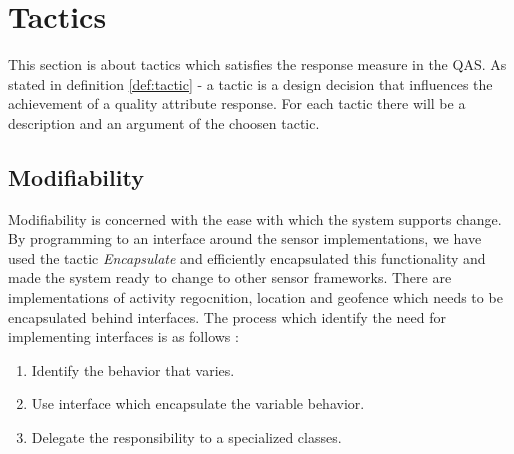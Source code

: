 \section{Tactics}
This section is about tactics which satisfies the response measure in the QAS. As stated in definition \ref{def:tactic} - a tactic is a design decision that influences the achievement of a quality attribute response. For each tactic there will be a description and an argument of the choosen tactic. 

\subsection{Modifiability}
\label{subsec:modifiability}
 Modifiability is concerned with the ease with which the system supports change. By programming to an interface around the sensor implementations, we have used the tactic \textit{Encapsulate} \cite{Bass} and efficiently encapsulated this functionality and made the system ready to change to other sensor frameworks. There are implementations of activity regocnition, location and geofence which needs to be encapsulated behind interfaces. The process which identify the need for implementing interfaces is as follows \cite{Baerbak10}: 

\begin{enumerate}
    \item Identify the behavior that varies. 

    \item Use interface which encapsulate the variable behavior.     
    
    \item Delegate the responsibility to a specialized classes.
\end{enumerate}
 
 
 
